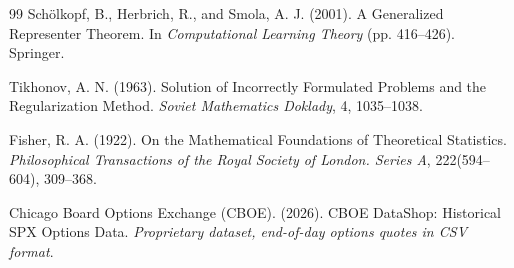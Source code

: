 \documentclass[12pt,oneside]{report}
\theoremstyle{definition}
\theoremstyle{remark}
\begin{document}
\begin{thebibliography}{99}
Sch\"olkopf, B., Herbrich, R., and Smola, A. J. (2001).
A Generalized Representer Theorem.
In \textit{Computational Learning Theory} (pp. 416--426). Springer.

Tikhonov, A. N. (1963).
Solution of Incorrectly Formulated Problems and the Regularization Method.
\textit{Soviet Mathematics Doklady}, 4, 1035--1038.

Fisher, R. A. (1922).
On the Mathematical Foundations of Theoretical Statistics.
\textit{Philosophical Transactions of the Royal Society of London. Series A}, 222(594--604), 309--368.

Chicago Board Options Exchange (CBOE). (2026).
CBOE DataShop: Historical SPX Options Data.
\textit{Proprietary dataset, end-of-day options quotes in CSV format}.

\end{thebibliography}
\end{document}
